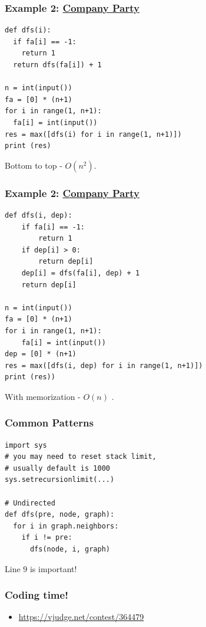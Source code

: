 \documentclass{beamer}
\begin{document}
\begin{frame}[fragile]
  \frametitle{Example 2: \href{https://vjudge.net/contest/364479\#problem/A}{Company Party}}
\begin{verbatim}
def dfs(i):
  if fa[i] == -1:
    return 1
  return dfs(fa[i]) + 1

n = int(input())
fa = [0] * (n+1)
for i in range(1, n+1):
  fa[i] = int(input())
res = max([dfs(i) for i in range(1, n+1)]) 
print (res)
\end{verbatim}

Bottom to top - $O(n^2)$.
\end{frame}

\begin{frame}[fragile]
  \frametitle{Example 2: \href{https://vjudge.net/contest/364479\#problem/A}{Company Party}}
\begin{verbatim}
def dfs(i, dep):
	if fa[i] == -1:
		return 1
	if dep[i] > 0:
		return dep[i]
	dep[i] = dfs(fa[i], dep) + 1
	return dep[i]

n = int(input())
fa = [0] * (n+1)
for i in range(1, n+1):
	fa[i] = int(input())
dep = [0] * (n+1)
res = max([dfs(i, dep) for i in range(1, n+1)]) 
print (res))
\end{verbatim}

With memorization - $O(n)$ .
\end{frame}

\begin{frame}[fragile]
  \frametitle{Common Patterns}
\begin{verbatim}
import sys
# you may need to reset stack limit, 
# usually default is 1000
sys.setrecursionlimit(...)

# Undirected
def dfs(pre, node, graph):
  for i in graph.neighbors:
    if i != pre:
      dfs(node, i, graph)
\end{verbatim}

Line $9$ is important!

\end{frame}

\begin{frame}
  \frametitle{Coding time!}
  \begin{itemize}
    \item \url{https://vjudge.net/contest/364479}
  \end{itemize}
\end{frame}
\end{document}
